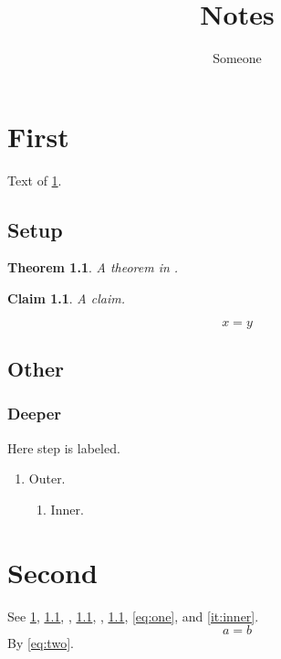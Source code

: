 \documentclass{report}
\title{Notes}
\author{Someone}
\newtheorem{theorem}{Theorem}[section]
\newtheorem{claim}{Claim}
\newcounter{step}[section]
\begin{document}
\maketitle
\chapter{First}\label{ch:first}
Text of \cref{ch:first}.
\section{Setup}\label{sec:setup}
\begin{theorem}\label{thm:a}
A theorem in .
\end{theorem}
\begin{claim}\label{cl:one}
A claim.
\end{claim}
\begin{equation}\label{eq:one}
x = y
\end{equation}
\section{Other}
\subsection{Deeper}\label{sec:deeper}
Here \label{step:one}step \thestep{} is labeled.
\begin{enumerate}
\item Outer.\label{it:outer}
\begin{enumerate}
\item Inner.\label{it:inner}
\end{enumerate}
\end{enumerate}
\chapter{Second}
See \cref{ch:first}, \cref{sec:setup}, , \cref{thm:a}, , \cref{cl:one}, \cref{eq:one},  and \cref{it:inner}.
\begin{equation}\label{eq:two}
a = b
\end{equation}
By \cref{eq:two}.
\end{document}
